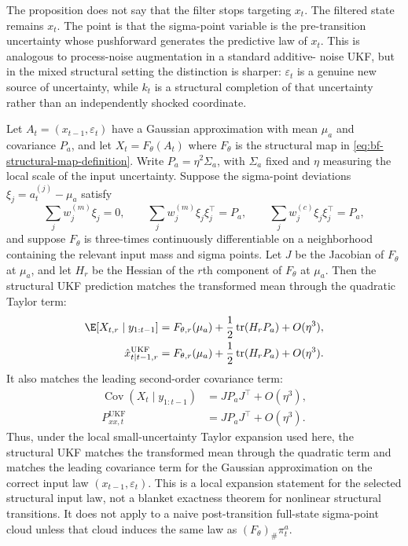The proposition does not say that the filter stops targeting $x_t$.  The
filtered state remains $x_t$.  The point is that the sigma-point variable is the
pre-transition uncertainty whose pushforward generates the predictive law of
$x_t$.  This is analogous to process-noise augmentation in a standard additive-
noise UKF, but in the mixed structural setting the distinction is sharper:
$\varepsilon_t$ is a genuine new source of uncertainty, while $k_t$ is a
structural completion of that uncertainty rather than an independently shocked
coordinate.

\begin{proposition}
\label{prop:bf-structural-ukf-ut-accuracy}
Let $A_t=(x_{t-1},\varepsilon_t)$ have a Gaussian approximation with mean
$\mu_a$ and covariance $P_a$, and let
$X_t=F_\theta(A_t)$ where $F_\theta$ is the structural map in
\eqref{eq:bf-structural-map-definition}.  Write
$P_a=\eta^2\Sigma_a$, with $\Sigma_a$ fixed and $\eta$ measuring the local
scale of the input uncertainty.  Suppose the sigma-point deviations
$\xi_j=a_t^{(j)}-\mu_a$ satisfy
\[
  \sum_j w_j^{(m)}\xi_j=0,
  \qquad
  \sum_j w_j^{(m)}\xi_j\xi_j^\top=P_a,
  \qquad
  \sum_j w_j^{(c)}\xi_j\xi_j^\top=P_a,
\]
and suppose $F_\theta$ is three-times continuously differentiable on a
neighborhood containing the relevant input mass and sigma points.  Let $J$ be
the Jacobian of $F_\theta$ at $\mu_a$, and let $H_r$ be the Hessian of the
$r$th component of $F_\theta$ at $\mu_a$.  Then the structural UKF prediction
matches the transformed mean through the quadratic Taylor term:
\begin{align}
  \E[X_{t,r}\mid y_{1:t-1}]
    &=
    F_{\theta,r}(\mu_a)
    +\frac{1}{2}\operatorname{tr}(H_rP_a)
    +O(\eta^3),\\
  \hat x_{t|t-1,r}^{\mathrm{UKF}}
    &=
    F_{\theta,r}(\mu_a)
    +\frac{1}{2}\operatorname{tr}(H_rP_a)
    +O(\eta^3).
    \label{eq:bf-structural-ukf-second-order-mean}
\end{align}
It also matches the leading second-order covariance term:
\begin{align}
  \operatorname{Cov}(X_t\mid y_{1:t-1})
    &=
    JP_aJ^\top+O(\eta^3),\\
  P_{xx,t}^{\mathrm{UKF}}
    &=
    JP_aJ^\top+O(\eta^3).
    \label{eq:bf-structural-ukf-second-order-cov}
\end{align}
Thus, under the local small-uncertainty Taylor expansion used here, the
structural UKF matches the transformed mean through the quadratic term and
matches the leading covariance term for the Gaussian approximation on the
correct input law $(x_{t-1},\varepsilon_t)$.  This is a local expansion
statement for the selected structural input law, not a blanket exactness theorem
for nonlinear structural transitions.  It does not apply to a naive
post-transition full-state sigma-point cloud unless that cloud induces the same
law as $(F_\theta)_\#\pi_t^a$.
\end{proposition}

